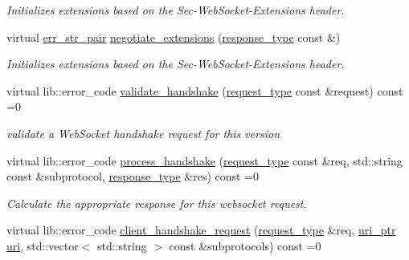 \begin{DoxyCompactItemize}
\begin{DoxyCompactList}\small\item\em Initializes extensions based on the Sec-\/\+Web\+Socket-\/\+Extensions header. \end{DoxyCompactList}\item 
virtual \hyperlink{classwebsocketpp_1_1processor_1_1processor_aa17cb49b100ed209ca8650895812be11}{err\+\_\+str\+\_\+pair} \hyperlink{classwebsocketpp_1_1processor_1_1processor_a236ab7829e607fa58cc94c219a1a680c}{negotiate\+\_\+extensions} (\hyperlink{classwebsocketpp_1_1processor_1_1processor_aa8d088af1bdb838f1e86df6cf4395981}{response\+\_\+type} const \&)
\begin{DoxyCompactList}\small\item\em Initializes extensions based on the Sec-\/\+Web\+Socket-\/\+Extensions header. \end{DoxyCompactList}\item 
virtual lib\+::error\+\_\+code \hyperlink{classwebsocketpp_1_1processor_1_1processor_a627ee42d97f2810e3e17c79586748930}{validate\+\_\+handshake} (\hyperlink{classwebsocketpp_1_1processor_1_1processor_ac3926102ce2422e6b40ccea41e764233}{request\+\_\+type} const \&request) const  =0
\begin{DoxyCompactList}\small\item\em validate a Web\+Socket handshake request for this version \end{DoxyCompactList}\item 
virtual lib\+::error\+\_\+code \hyperlink{classwebsocketpp_1_1processor_1_1processor_abb424e391f3fc71e2972d8e86ca38c10}{process\+\_\+handshake} (\hyperlink{classwebsocketpp_1_1processor_1_1processor_ac3926102ce2422e6b40ccea41e764233}{request\+\_\+type} const \&req, std\+::string const \&subprotocol, \hyperlink{classwebsocketpp_1_1processor_1_1processor_aa8d088af1bdb838f1e86df6cf4395981}{response\+\_\+type} \&res) const  =0
\begin{DoxyCompactList}\small\item\em Calculate the appropriate response for this websocket request. \end{DoxyCompactList}\item 
virtual lib\+::error\+\_\+code \hyperlink{classwebsocketpp_1_1processor_1_1processor_a8894173870b34eb8a6dc7b997cc7f79c}{client\+\_\+handshake\+\_\+request} (\hyperlink{classwebsocketpp_1_1processor_1_1processor_ac3926102ce2422e6b40ccea41e764233}{request\+\_\+type} \&req, \hyperlink{namespacewebsocketpp_aae370ea5ac83a8ece7712cb39fc23f5b}{uri\+\_\+ptr} \hyperlink{classwebsocketpp_1_1uri}{uri}, std\+::vector$<$ std\+::string $>$ const \&subprotocols) const  =0

\end{DoxyCompactItemize}
